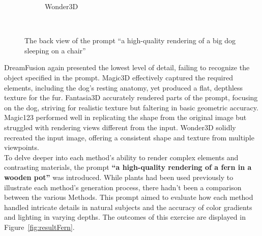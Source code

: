 \begin{figure}[ht]
\begin{subfigure}[b]{0.27\textwidth}
        \caption{Wonder3D}
        \vspace{0.1cm}
    \end{subfigure}
    \caption{The back view of the prompt ``a high-quality rendering of a big dog sleeping on a chair''}~\label{fig:resultDogBack}
\end{figure}

DreamFusion again presented the lowest level of detail, failing to recognize the object specified in the prompt. Magic3D effectively captured the required elements, including the dog's resting anatomy, yet produced a flat, depthless texture for the fur. Fantasia3D accurately rendered parts of the prompt, focusing on the dog, striving for realistic texture but faltering in basic geometric accuracy. Magic123 performed well in replicating the shape from the original image but struggled with rendering views different from the input. Wonder3D solidly recreated the input image, offering a consistent shape and texture from multiple viewpoints.\\






To delve deeper into each method's ability to render complex elements and contrasting materials, the prompt \textbf{``a high-quality rendering of a fern in a wooden pot''} was introduced. While plants had been used previously to illustrate each method's generation process, there hadn't been a comparison between the various Methods. This prompt aimed to evaluate how each method handled intricate details in natural subjects and the accuracy of color gradients and lighting in varying depths. The outcomes of this exercise are displayed in Figure~\ref{fig:resultFern}.


